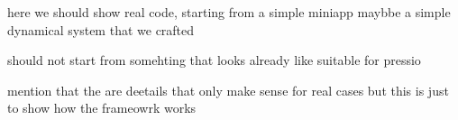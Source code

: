 
\begin{DoxyItemize}
\item here we should show real code, starting from a simple miniapp maybbe a simple dynamical system that we crafted
\item should not start from somehting that looks already like suitable for pressio
\item mention that the are deetails that only make sense for real cases but this is just to show how the frameowrk works 
\end{DoxyItemize}